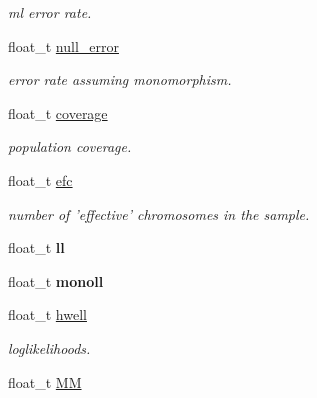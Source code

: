 \begin{DoxyCompactItemize}
\begin{DoxyCompactList}\small\item\em ml error rate. \end{DoxyCompactList}\item 
\hypertarget{classallele__stat_ab23917b9abc4739489f04d054ba3b912}{float\-\_\-t \hyperlink{classallele__stat_ab23917b9abc4739489f04d054ba3b912}{null\-\_\-error}}\label{classallele__stat_ab23917b9abc4739489f04d054ba3b912}

\begin{DoxyCompactList}\small\item\em error rate assuming monomorphism. \end{DoxyCompactList}\item 
\hypertarget{classallele__stat_a89c2d796a01de75df3657ff6b91a388a}{float\-\_\-t \hyperlink{classallele__stat_a89c2d796a01de75df3657ff6b91a388a}{coverage}}\label{classallele__stat_a89c2d796a01de75df3657ff6b91a388a}

\begin{DoxyCompactList}\small\item\em population coverage. \end{DoxyCompactList}\item 
\hypertarget{classallele__stat_a41e9b6e18c8028aa69e8afa2b52a5be1}{float\-\_\-t \hyperlink{classallele__stat_a41e9b6e18c8028aa69e8afa2b52a5be1}{efc}}\label{classallele__stat_a41e9b6e18c8028aa69e8afa2b52a5be1}

\begin{DoxyCompactList}\small\item\em number of 'effective' chromosomes in the sample. \end{DoxyCompactList}\item 
\hypertarget{classallele__stat_a655524da46c1908a259b6e2ba7acf157}{float\-\_\-t {\bfseries ll}}\label{classallele__stat_a655524da46c1908a259b6e2ba7acf157}

\item 
\hypertarget{classallele__stat_a101556e556a1e373e1e9b3a162c9561a}{float\-\_\-t {\bfseries monoll}}\label{classallele__stat_a101556e556a1e373e1e9b3a162c9561a}

\item 
\hypertarget{classallele__stat_a5e329a813feecc20eca8f6322d93a179}{float\-\_\-t \hyperlink{classallele__stat_a5e329a813feecc20eca8f6322d93a179}{hwell}}\label{classallele__stat_a5e329a813feecc20eca8f6322d93a179}

\begin{DoxyCompactList}\small\item\em loglikelihoods. \end{DoxyCompactList}\item 
\hypertarget{classallele__stat_aaafd3e268c3eb3bd194ba302a6325675}{float\-\_\-t \hyperlink{classallele__stat_aaafd3e268c3eb3bd194ba302a6325675}{M\-M}}\label{classallele__stat_aaafd3e268c3eb3bd194ba302a6325675}


\end{DoxyCompactItemize}
